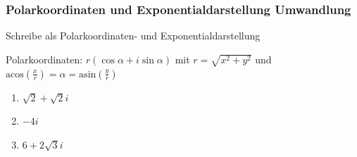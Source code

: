 \documentclass[11pt, a4paper]{article}
\newcommand\braces[1]{\left(#1\right)}
\newcommand{\acos}[1]{\mathrm{acos}\braces{#1}}
\newcommand{\asin}[1]{\mathrm{asin}\braces{#1}}
\newif\ifshowsolution
\begin{document}
\subsubsection{Polarkoordinaten und Exponentialdarstellung Umwandlung}
Schreibe als Polarkoordinaten- und Exponentialdarstellung

Polarkoordinaten: $r(\cos \alpha + i \sin \alpha)$ mit $r=\sqrt{x^2+y^2}$ und $\acos{\frac{x}{r}} = \alpha = \asin{\frac{y}{r}}$

\begin{enumerate}
	\item $\sqrt{2}+\sqrt{2}i$
	
	\ifshowsolution
		$r = \sqrt{(\sqrt{2})^2 + (\sqrt{2})^2} = \sqrt{4} = 2$ \\
		$\cos \alpha = \frac{\sqrt{2}}{2} \quad \Rightarrow \quad \alpha = \acos{\frac{\sqrt{2}}{2}} \quad \Rightarrow \quad \alpha = \frac{\pi}{4} \lor \alpha = \frac{7\pi}{4}$ \\
		$\sin \alpha = \frac{\sqrt{2}}{2} \quad \Rightarrow \quad \alpha = \asin{\frac{\sqrt{2}}{2}} \quad \Rightarrow \quad \alpha = \frac{\pi}{4} \lor \alpha = \frac{3\pi}{4}$ \\
		Polarkoordinaten: $2 \braces{\cos \frac{\pi}{4} + i \sin \frac{\pi}{4}}$ \\
		Exponentialschreibweise: $2 e^{i \frac{\pi}{4}}$
	\fi
	
	\item $-4i$
	
	\ifshowsolution
		$r = \sqrt{(-4)^2} = 4$ \\
		$\cos \alpha = -\frac{0}{4} \quad \Rightarrow \quad \alpha = \acos{(0)} \quad \Rightarrow \quad \alpha = \frac{\pi}{2} \lor \alpha = \frac{3\pi}{2}$ \\
		$\sin \alpha = -\frac{4}{4} \quad \Rightarrow \quad \alpha = \asin{(-1)} \quad \Rightarrow \quad \alpha = \frac{3\pi}{2}$ \\
		Polarkoordinaten: $4 \braces{\cos \frac{3\pi}{2} + i \sin \frac{3\pi}{2}}$ \\
		Exponentialschreibweise: $4 e^{i \frac{3\pi}{2}}$
	\fi
	
	\item $6+2\sqrt{3}i$
	
	\ifshowsolution
		$r = \sqrt{6^2 + (2\sqrt{3})^2} = \sqrt{36 + 4 \cdot 3} = \sqrt{48} = 4 \sqrt{3}$ \\
		$\cos \alpha = \frac{6}{4\sqrt{3}} = \frac{\sqrt{3}}{2} \quad \Rightarrow \quad \alpha = \acos{\frac{\sqrt{3}}{2}} \quad \Rightarrow \quad \alpha = \frac{\pi}{6} \lor \alpha = \frac{11\pi}{6}$ \\
		$\sin \alpha = \frac{2\sqrt{3}}{4\sqrt{3}} = \frac{1}{2} \quad \Rightarrow \quad \alpha = \asin{\frac{1}{2}} \quad \Rightarrow \quad \alpha = \frac{\pi}{6} \lor \alpha = \frac{5\pi}{6}$ \\
		Polarkoordinaten: $4\sqrt{3} \braces{\cos \frac{\pi}{6} + i \sin \frac{\pi}{6} }$ \\
		Exponentialschreibweise: $4\sqrt{3} \cdot e^{i \frac{\pi}{6}}$
	\fi
\end{enumerate}
\end{document}
